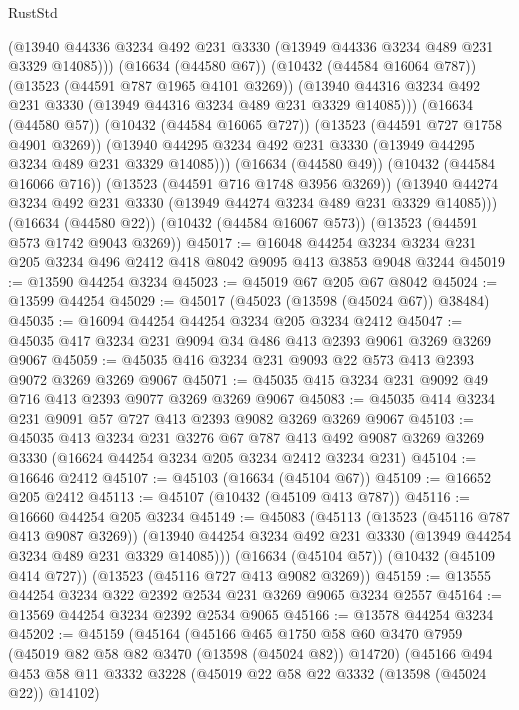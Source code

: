 \begin{lexlean}{RustStd}
\begin{coremodule}
            (@13940 @44336 @3234 @492 @231 @3330 (@13949 @44336 @3234 @489 @231 @3329 @14085)))
          (@16634 (@44580 @67))
          (@10432 (@44584 @16064 @787))
          (@13523 (@44591 @787 @1965 @4101 @3269))
          (@13940 @44316 @3234 @492 @231 @3330 (@13949 @44316 @3234 @489 @231 @3329 @14085)))
        (@16634 (@44580 @57))
        (@10432 (@44584 @16065 @727))
        (@13523 (@44591 @727 @1758 @4901 @3269))
        (@13940 @44295 @3234 @492 @231 @3330 (@13949 @44295 @3234 @489 @231 @3329 @14085)))
      (@16634 (@44580 @49))
      (@10432 (@44584 @16066 @716))
      (@13523 (@44591 @716 @1748 @3956 @3269))
      (@13940 @44274 @3234 @492 @231 @3330 (@13949 @44274 @3234 @489 @231 @3329 @14085)))
    (@16634 (@44580 @22))
    (@10432 (@44584 @16067 @573))
    (@13523 (@44591 @573 @1742 @9043 @3269))
@45017 := @16048
    @44254
    @3234
    @3234
    @231
    @205
    @3234
    @496
    @2412
    @418
    @8042
    @9095
    @413
    @3853
    @9048
    @3244
@45019 := @13590 @44254 @3234
@45023 := @45019 @67 @205 @67 @8042
@45024 := @13599 @44254
@45029 := @45017 (@45023 (@13598 (@45024 @67)) @38484)
@45035 := @16094 @44254 @44254 @3234 @205 @3234 @2412
@45047 := @45035 @417 @3234 @231 @9094 @34 @486 @413 @2393 @9061 @3269 @3269 @9067
@45059 := @45035 @416 @3234 @231 @9093 @22 @573 @413 @2393 @9072 @3269 @3269 @9067
@45071 := @45035 @415 @3234 @231 @9092 @49 @716 @413 @2393 @9077 @3269 @3269 @9067
@45083 := @45035 @414 @3234 @231 @9091 @57 @727 @413 @2393 @9082 @3269 @3269 @9067
@45103 := @45035
    @413
    @3234
    @231
    @3276
    @67
    @787
    @413
    @492
    @9087
    @3269
    @3269
    @3330
    (@16624 @44254 @3234 @205 @3234 @2412 @3234 @231)
@45104 := @16646 @2412
@45107 := @45103 (@16634 (@45104 @67))
@45109 := @16652 @205 @2412
@45113 := @45107 (@10432 (@45109 @413 @787))
@45116 := @16660 @44254 @205 @3234
@45149 := @45083
    (@45113
      (@13523 (@45116 @787 @413 @9087 @3269))
      (@13940 @44254 @3234 @492 @231 @3330 (@13949 @44254 @3234 @489 @231 @3329 @14085)))
    (@16634 (@45104 @57))
    (@10432 (@45109 @414 @727))
    (@13523 (@45116 @727 @413 @9082 @3269))
@45159 := @13555 @44254 @3234 @322 @2392 @2534 @231 @3269 @9065 @3234 @2557
@45164 := @13569 @44254 @3234 @2392 @2534 @9065
@45166 := @13578 @44254 @3234
@45202 := @45159
    (@45164
      (@45166
        @465
        @1750
        @58
        @60
        @3470
        @7959
        (@45019 @82 @58 @82 @3470 (@13598 (@45024 @82)) @14720)
        (@45166
          @494
          @453
          @58
          @11
          @3332
          @3228
          (@45019 @22 @58 @22 @3332 (@13598 (@45024 @22)) @14102)

\end{coremodule}
\end{lexlean}
